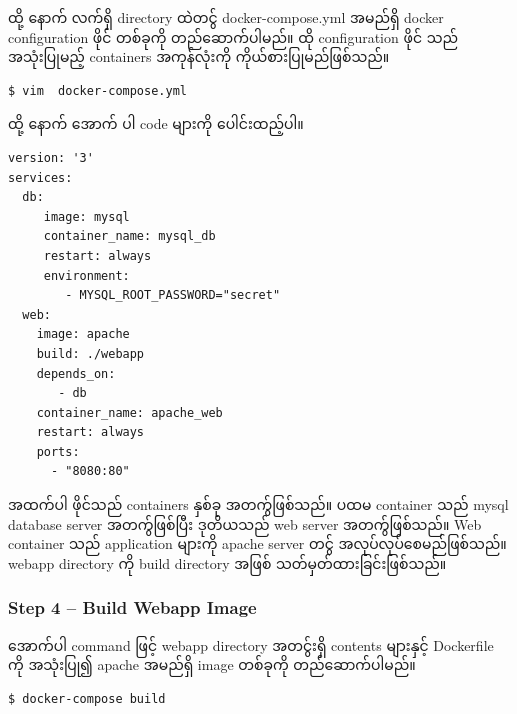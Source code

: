\documentclass{article}
\begin{document}
ထို့ နောက် လက်ရှိ directory ထဲတင်ွ docker-compose.yml အမည်ရှိ docker
configuration ဖိုင် တစ်ခုကို တည်ဆောက်ပါမည်။ ထို configuration ဖိုင် သည်
အသုံးပြုမည့် containers အကုန်လုံးကို ကိုယ်စားပြုမည်ဖြစ်သည်။

\begin{verbatim}
$ vim  docker-compose.yml
\end{verbatim}

ထို့ နောက် အောက် ပါ code များကို ပေါင်းထည့်ပါ။

\begin{verbatim}
version: '3'
services:
  db:
     image: mysql
     container_name: mysql_db
     restart: always
     environment:
        - MYSQL_ROOT_PASSWORD="secret"
  web:
    image: apache
    build: ./webapp
    depends_on:
       - db
    container_name: apache_web
    restart: always
    ports:
      - "8080:80"
\end{verbatim}

အထက်ပါ ဖိုင်သည် containers နှစ်ခု အတက်ွဖြစ်သည်။ ပထမ container သည် mysql
database server အတက်ွဖြစ်ပြီး ဒုတိယသည် web server အတက်ွဖြစ်သည်။ Web
container သည် application များကို apache server တင်ွ
အလုပ်လုပ်စေမည်ဖြစ်သည်။ webapp directory ကို build directory အဖြစ်
သတ်မှတ်ထားခြင်းဖြစ်သည်။

\subsubsection{Step 4 -- Build Webapp
Image}\label{step-4-build-webapp-image}

အောက်ပါ command ဖြင့် webapp directory အတင်ွးရှိ contents များနှင့်
Dockerfile ကို အသုံးပြု၍ apache အမည်ရှိ image တစ်ခုကို တည်ဆောက်ပါမည်။

\begin{verbatim}
$ docker-compose build
\end{verbatim}
\end{document}
